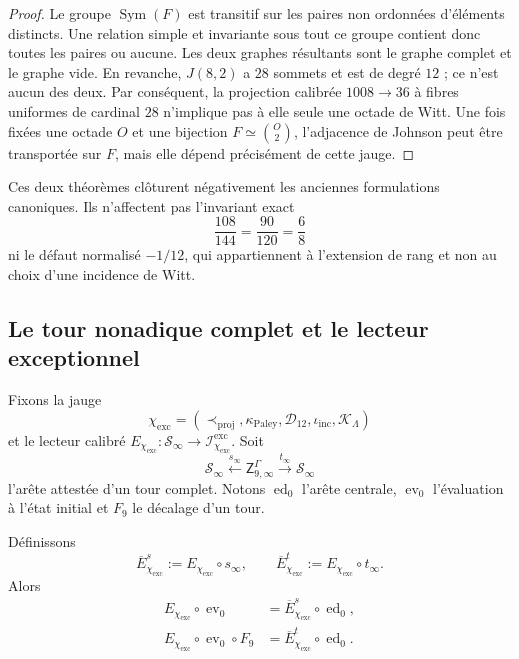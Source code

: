 \begin{proof}
Le groupe \(\operatorname{Sym}(F)\) est transitif sur les paires non ordonnées
d'éléments distincts. Une relation simple et invariante sous tout ce groupe
contient donc toutes les paires ou aucune. Les deux graphes résultants sont
le graphe complet et le graphe vide. En revanche, \(J(8,2)\) a \(28\) sommets et est de
degré \(12\) ; ce n'est aucun des deux. Par conséquent, la projection
calibrée \(1008\to36\) à fibres uniformes de cardinal \(28\) n'implique pas
à elle seule une octade de Witt. Une fois fixées une octade \(O\) et une bijection
\(F\simeq\binom{O}{2}\), l'adjacence de Johnson peut être transportée sur \(F\),
mais elle dépend précisément de cette jauge.
\end{proof}

Ces deux théorèmes clôturent négativement les anciennes formulations
canoniques. Ils n'affectent pas l'invariant exact
\[
 \frac{108}{144}=\frac{90}{120}=\frac68
\]
ni le défaut normalisé \(-1/12\), qui appartiennent à l'extension de rang
et non au choix d'une incidence de Witt.

\subsection{Le tour nonadique complet et le lecteur exceptionnel}

Fixons la jauge
\[
 \chi_{\mathrm{exc}}
 =(
 \prec_{\mathrm{proj}},
 \kappa_{\mathrm{Paley}},
 \mathcal D_{12},
 \iota_{\mathrm{inc}},
 \mathcal K_{\Lambda})
\]
et le lecteur calibré
\(E_{\chi_{\mathrm{exc}}}:\mathscr S_\infty
\to\mathcal I^{\mathrm{exc}}_{\chi_{\mathrm{exc}}}\).
Soit
\[
 \mathscr S_\infty\xleftarrow{s_\infty}
 \mathsf Z^{\Gamma}_{9,\infty}
 \xrightarrow{t_\infty}\mathscr S_\infty
\]
l'arête attestée d'un tour complet. Notons
\(\operatorname{ed}_0\) l'arête centrale, \(\operatorname{ev}_0\)
l'évaluation à l'état initial et \(F_9\) le décalage d'un tour.

\begin{theorem}
\label{thm:hmt-final-factorizacion-gamma-nueve}
Définissons
\[
 \overline E^{s}_{\chi_{\mathrm{exc}}}
 :=E_{\chi_{\mathrm{exc}}}\circ s_\infty,
 \qquad
 \overline E^{t}_{\chi_{\mathrm{exc}}}
 :=E_{\chi_{\mathrm{exc}}}\circ t_\infty.
\]
Alors
\begin{align}
 E_{\chi_{\mathrm{exc}}}\circ\operatorname{ev}_0
 &=\overline E^{s}_{\chi_{\mathrm{exc}}}
   \circ\operatorname{ed}_0,
 \label{eq:hmt-final-factorizacion-gamma-fuente}\\
 E_{\chi_{\mathrm{exc}}}\circ\operatorname{ev}_0\circ F_9
 &=\overline E^{t}_{\chi_{\mathrm{exc}}}
   \circ\operatorname{ed}_0.
 \label{eq:hmt-final-factorizacion-gamma-destino}
\end{align}
\end{theorem}

